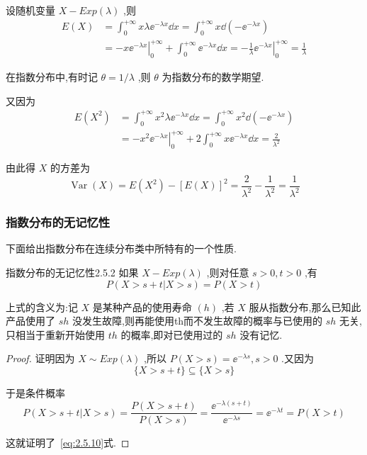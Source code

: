 设随机变量 $ X-E x p(\lambda) $ ,则
\[
\begin{aligned} 
E(X) &=\int_{0}^{+\infty} x \lambda \ee ^{-\lambda x} \dd x=\int_{0}^{+\infty} x \dd\left(-\ee ^{-\lambda x}\right) \\
&=-x\left.\ee ^{-\lambda x}\right|_{0} ^{+\infty}+\int_{0}^{+\infty} \ee ^{-\lambda x} \dd x=-\frac{1}{\lambda}\left.\ee ^{-\lambda x}\right|_{0} ^{+\infty}=\frac{1}{\lambda} 
\end{aligned}
\]

在指数分布中,有时记 $ \theta=1 / \lambda $ ,则 $ \theta $ 为指数分布的数学期望.

又因为
\[
\begin{aligned} E\left(X^{2}\right) &=\int_{0}^{+\infty} x^{2} \lambda \ee ^{-\lambda x} \dd x=\int_{0}^{+\infty} x^{2} \dd\left(-\ee ^{-\lambda x}\right) \\ &=-x^{2}\left.\ee ^{-\lambda x}\right|_{0} ^{+\infty}+2 \int_{0}^{+\infty} x \ee ^{-\lambda x} \dd x=\frac{2}{\lambda^{2}} \end{aligned}
\]

由此得 $ X $ 的方差为
\[
\operatorname{Var}(X)=E\left(X^{2}\right)-[E(X)]^{2}=\frac{2}{\lambda^{2}}-\frac{1}{\lambda^{2}}=\frac{1}{\lambda^{2}}
\]

\subsubsection{指数分布的无记忆性}

下面给出指数分布在连续分布类中所特有的一个性质.

\begin{theorem}{指数分布的无记忆性}{2.5.2}
	如果 $ X-E x p(\lambda) $ ,则对任意 $ s>0,t>0 $ ,有
	\begin{equation}
	P(X>s+t | X>s)=P(X>t) \label{eq:2.5.10}
	\end{equation}
\end{theorem}

上式的含义为:记 $ X $ 是某种产品的使用寿命 $ (h) $ ,若 $ X $ 服从指数分布,那么已知此产品使用了 $ sh $ 没发生故障,则再能使用th而不发生故障的概率与已使用的 $ sh $ 无关,只相当于重新开始使用 $ th $ 的概率,即对已使用过的 $ sh $ 没有记忆.

\begin{proof}
	证明因为 $ X \sim E x p(\lambda) $ ,所以 $ P(X>s)=\ee ^{-\lambda s}, s>0 $ .又因为
	\[
	\{X>s+t\} \subseteq\{X>s\}
	\]
	
	于是条件概率
	\[
	P(X>s+t | X>s)=\frac{P(X>s+t)}{P(X>s)}=\frac{\ee ^{-\lambda(s+t)}}{\ee ^{-\lambda s}}=\ee ^{-\lambda t}=P(X>t)
	\]
	
	这就证明了~\ref{eq:2.5.10}式.
\end{proof}

